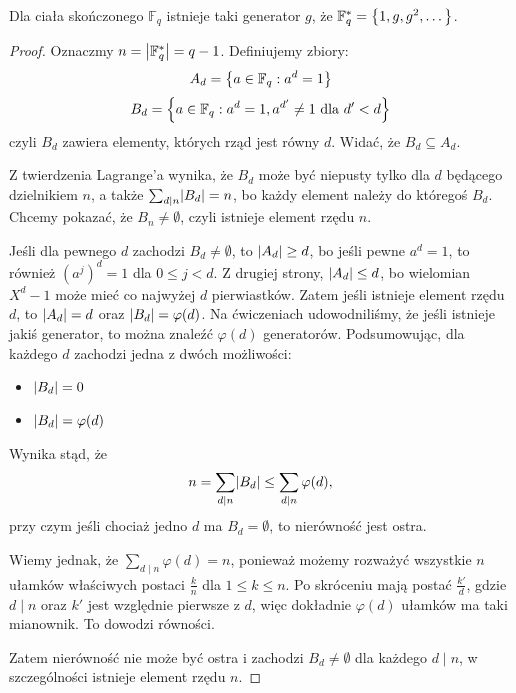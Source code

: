 \begin{theorem}
Dla ciała skończonego \( \mathbb{F}_q \) istnieje taki generator \( g \), że \( \mathbb{F}^{*}_q = \set{1, g, g^2, \text{\dots}} \).
\end{theorem}
\begin{proof}
    Oznaczmy \( n = \left\lvert\mathbb{F}^{*}_q\right\rvert = q-1 \). Definiujemy zbiory:
    \[
        A_d = \set{a \in \mathbb{F}_q : a^d = 1}
    \]
    \[
        B_d = \set{a \in \mathbb{F}_q : a^d = 1, a^{d'} \neq 1 \text{ dla } d' < d}
    \]
    czyli \( B_d \) zawiera elementy, których rząd jest równy \( d \). Widać, że \( B_d \subseteq A_d \).

    Z twierdzenia Lagrange'a wynika, że \( B_d \) może być niepusty tylko dla \( d \) będącego dzielnikiem \( n \), a także \( \sum_{d \mid n} \abs{B_d} = n \), bo każdy element należy do któregoś \( B_d \). Chcemy pokazać, że \( B_n \neq \emptyset \), czyli istnieje element rzędu \( n \).

    Jeśli dla pewnego \( d \) zachodzi \( B_d \neq \emptyset \), to \( \left\lvert A_d\right\rvert \geq d \), bo jeśli pewne \( a^d = 1 \), to również \( (a^j)^d = 1 \) dla \( 0 \leq j < d \). Z drugiej strony, \( \left\lvert A_d\right\rvert \leq d \), bo wielomian \( X^d-1 \) może mieć co najwyżej \( d \) pierwiastków. Zatem jeśli istnieje element rzędu \( d \), to \( \left\lvert A_d\right\rvert = d \) oraz \( \left\lvert B_d\right\rvert = \varphi(d) \).
    Na ćwiczeniach udowodniliśmy, że jeśli istnieje jakiś generator, to można znaleźć \( \varphi(d) \) generatorów.
    Podsumowując, dla każdego \( d \) zachodzi jedna z dwóch możliwości:
    \begin{itemize}
        \item \( \left\lvert B_d\right\rvert = 0 \)
        \item \( \left\lvert B_d\right\rvert = \varphi(d) \)
    \end{itemize}
    Wynika stąd, że
    \[
        n = \sum_{d \mid n} \abs{B_d} \leq \sum_{d \mid n} \varphi(d), 
    \]
    przy czym jeśli chociaż jedno \( d \) ma \( B_d = \emptyset \), to nierówność jest ostra.
    
    Wiemy jednak, że \( \sum_{d \mid n} \varphi(d) = n \), ponieważ możemy rozważyć wszystkie \( n \) ułamków właściwych postaci \( \frac{k}{n} \) dla \( 1 \leq k \leq n \).
    Po skróceniu mają postać \( \frac{k'}{d} \), gdzie \( d \mid n \) oraz \( k' \) jest względnie pierwsze z \( d \), więc dokładnie \( \varphi(d) \) ułamków ma taki mianownik. To dowodzi równości.

    Zatem nierówność nie może być ostra i zachodzi \( B_d \neq \emptyset \) dla każdego \( d \mid n \), w szczególności istnieje element rzędu \( n \).
\end{proof}
